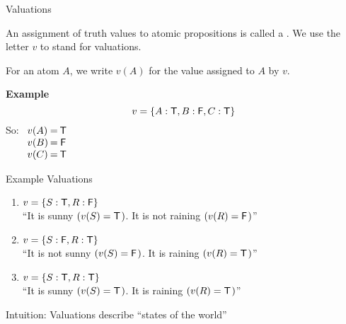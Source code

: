 \documentclass[xetex,aspectratio=169,14pt,hyperref={pdfpagelabels=true,pdflang={en-GB}}]{beamer}
\begin{document}
\begin{frame}
  {Valuations}

  An assignment of truth values to atomic propositions is called a
  . We use the letter $v$ to stand for
  valuations.

  \medskip

  For an atom $A$, we write $v(A)$ for the value assigned
  to $A$ by $v$.

  \bigskip
  \pause

  \textbf{Example}
  \begin{displaymath}
    v = \{ A : \mathsf{T}, B : \mathsf{F}, C : \mathsf{T} \}
  \end{displaymath}
  So: $\begin{array}[t]{l@{\hspace{0.2em}}c@{\hspace{0.2em}}c}
         v(A) &=& \true \\
         v(B) &=& \false \\
         v(C) &=& \true
       \end{array}$

\end{frame}

\begin{frame}
  {Example Valuations}

  \begin{enumerate}
  \item $v = \{ S : \mathsf{T}, R : \mathsf{F} \}$ \\
    \quad \textcolor{black!60}{``It is sunny $(v(S) = \mathsf{T}\hspace{0.1em})$. It is not raining $(v(R) = \mathsf{F}\hspace{0.1em})$''}
  \item $v = \{ S : \mathsf{F}, R : \mathsf{T} \}$ \\
    \quad \textcolor{black!60}{``It is not sunny $(v(S) = \mathsf{F}\hspace{0.1em})$. It is raining $(v(R) = \mathsf{T}\hspace{0.1em})$''}
  \item $v = \{ S : \mathsf{T}, R : \mathsf{T} \}$ \\
    \quad \textcolor{black!60}{``It is sunny $(v(S) = \mathsf{T}\hspace{0.1em})$. It is raining $(v(R) = \mathsf{T}\hspace{0.1em})$''}
  \end{enumerate}

  \pause
  \bigskip

  \textcolor{black!60}{Intuition: }Valuations describe ``states of the world''
\end{frame}
\end{document}

